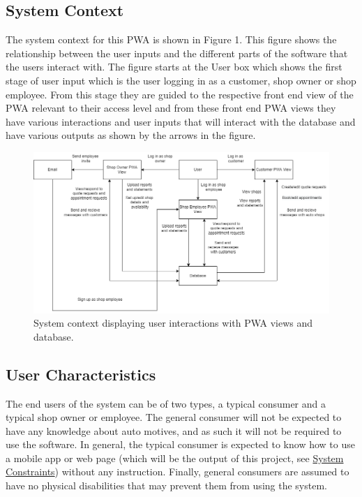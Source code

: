 \documentclass[12pt]{article}
\begin{document}
\subsection{System Context} \label{sec:SystemContext}

The system context for this PWA is shown in Figure 1. This figure shows the relationship between the user inputs and the different parts of the software that the users interact with. The figure starts at the User box which shows the first stage of user input which is the user logging in as a customer, shop owner or shop employee. From this stage they are guided to the respective front end view of the PWA relevant to their access level and from these front end PWA views they have various interactions and user inputs that will interact with the database and have various outputs as shown by the arrows in the figure.

\begin{figure}[h!]
\begin{center}
 \includegraphics[width=1\textwidth]{SystemContext}
\caption{System context displaying user interactions with PWA views and database. }
\label{Fig_SystemContext} 
\end{center}
\end{figure}

\subsection{User Characteristics} \label{SecUserCharacteristics}

The end users of the system can be of two types, a typical consumer and a typical shop owner or employee. The general consumer will not be expected to have any knowledge about auto motives, and as such it will not be required to use the software. In general, the typical consumer is expected to know how to use a mobile app or web page (which will be the output of this project, see \hyperref[constraints]{System Constraints}) without any instruction. Finally, general consumers are assumed to have no physical disabilities that may prevent them from using the system. 
\end{document}
